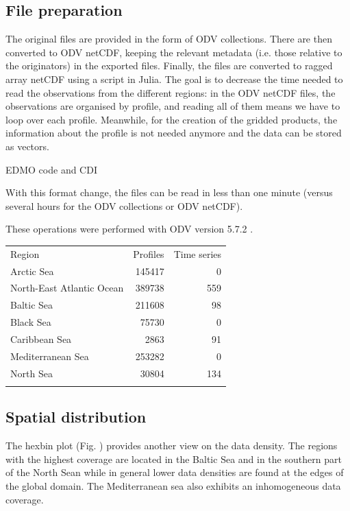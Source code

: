 \documentclass[essd, manuscript]{copernicus}
\begin{document}
\subsection{File preparation}

The original files are provided in the form of ODV \citep[Ocean Data View,][]{SCHLITZER2002} collections. There are then converted to ODV netCDF, keeping the relevant metadata (i.e. those relative to the originators) in the exported files. Finally, the files are converted to ragged array netCDF using a script in Julia. The goal is to decrease the time needed to read the observations from the different regions: in the ODV netCDF files, the observations are organised by profile, and reading all of them means we have to loop over each profile. Meanwhile, for the creation of the gridded products, the information about the profile is not needed anymore and the data can be stored as vectors.

EDMO code and CDI \citep{Schaap2010}

With this format change, the files can be read in less than one minute (versus several hours for the ODV collections or ODV netCDF).

These operations were performed with ODV version 5.7.2 \citep{Schlitzer2024}.

\begin{table}
\begin{tabular}{lrr}
\tophline
Region						& Profiles		& Time series	\\
\middlehline
Arctic Sea					& 145417		& 0				\\
North-East Atlantic Ocean	& 389738		& 559			\\
Baltic Sea					& 211608		& 98			\\
Black Sea					& 75730			& 0				\\
Caribbean Sea				& 2863			& 91			\\
Mediterranean Sea 			& 253282		& 0				\\
North Sea					& 30804			& 134			\\
\bottomhline
\end{tabular}
\end{table}
 

\subsection{Spatial distribution}

The hexbin plot (Fig. ) provides another view on the data density. The regions with the highest coverage are located in the Baltic Sea and in the southern part of the North Sean while in general lower data densities are found at the edges of the global domain. The Mediterranean sea also exhibits an inhomogeneous data coverage. 
\end{document}

